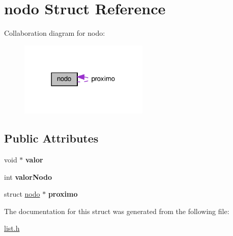 \hypertarget{structnodo}{}\section{nodo Struct Reference}
\label{structnodo}


Collaboration diagram for nodo\+:
\nopagebreak
\begin{figure}[H]
\begin{center}
\leavevmode
\includegraphics[width=174pt]{structnodo__coll__graph}
\end{center}
\end{figure}
\subsection*{Public Attributes}
\begin{DoxyCompactItemize}
\item 
\mbox{\label{structnodo_ab63adcdb83ea1fdcf4fa10f3cafc4a6a}} 
void $\ast$ {\bfseries valor}
\item 
\mbox{\label{structnodo_a885b76242a618b7fbdd7ac6bea4985c9}} 
int {\bfseries valor\+Nodo}
\item 
\mbox{\label{structnodo_aaaabdcb6641ddcdac8990402242b154a}} 
struct \hyperlink{structnodo}{nodo} $\ast$ {\bfseries proximo}
\end{DoxyCompactItemize}


The documentation for this struct was generated from the following file\+:\begin{DoxyCompactItemize}
\item 
\hyperlink{list_8h}{list.\+h}\end{DoxyCompactItemize}
